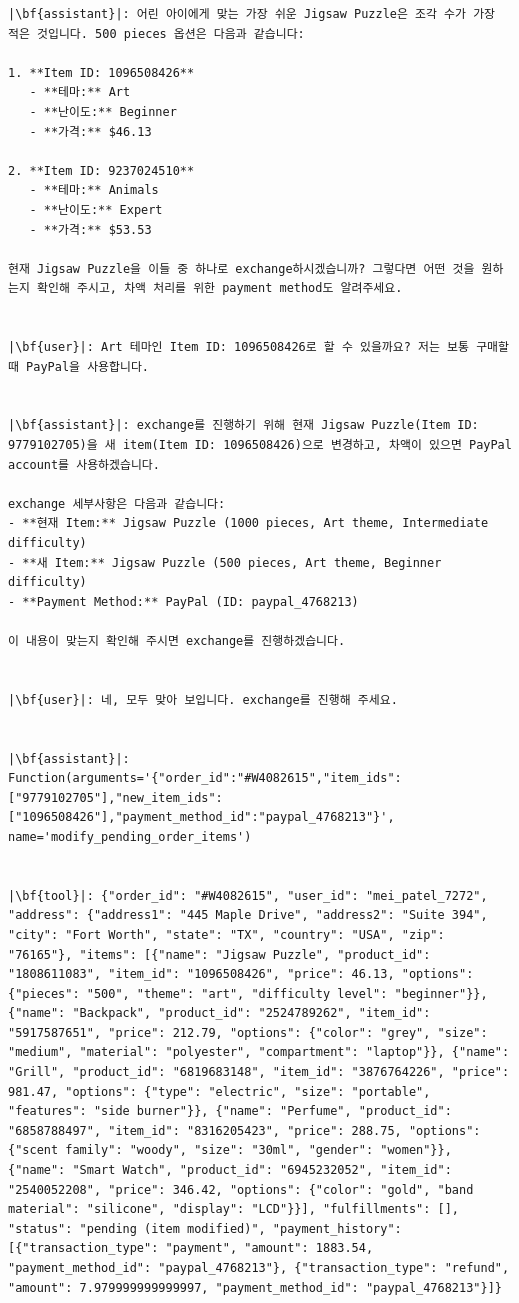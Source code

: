 \begin{verbatim}
|\bf{assistant}|: 어린 아이에게 맞는 가장 쉬운 Jigsaw Puzzle은 조각 수가 가장 적은 것입니다. 500 pieces 옵션은 다음과 같습니다:

1. **Item ID: 1096508426**
   - **테마:** Art
   - **난이도:** Beginner
   - **가격:** $46.13

2. **Item ID: 9237024510**
   - **테마:** Animals
   - **난이도:** Expert
   - **가격:** $53.53

현재 Jigsaw Puzzle을 이들 중 하나로 exchange하시겠습니까? 그렇다면 어떤 것을 원하는지 확인해 주시고, 차액 처리를 위한 payment method도 알려주세요.


|\bf{user}|: Art 테마인 Item ID: 1096508426로 할 수 있을까요? 저는 보통 구매할 때 PayPal을 사용합니다.


|\bf{assistant}|: exchange를 진행하기 위해 현재 Jigsaw Puzzle(Item ID: 9779102705)을 새 item(Item ID: 1096508426)으로 변경하고, 차액이 있으면 PayPal account를 사용하겠습니다.

exchange 세부사항은 다음과 같습니다:
- **현재 Item:** Jigsaw Puzzle (1000 pieces, Art theme, Intermediate difficulty)
- **새 Item:** Jigsaw Puzzle (500 pieces, Art theme, Beginner difficulty)
- **Payment Method:** PayPal (ID: paypal_4768213)

이 내용이 맞는지 확인해 주시면 exchange를 진행하겠습니다.


|\bf{user}|: 네, 모두 맞아 보입니다. exchange를 진행해 주세요.


|\bf{assistant}|: Function(arguments='{"order_id":"#W4082615","item_ids":["9779102705"],"new_item_ids":["1096508426"],"payment_method_id":"paypal_4768213"}', name='modify_pending_order_items')


|\bf{tool}|: {"order_id": "#W4082615", "user_id": "mei_patel_7272", "address": {"address1": "445 Maple Drive", "address2": "Suite 394", "city": "Fort Worth", "state": "TX", "country": "USA", "zip": "76165"}, "items": [{"name": "Jigsaw Puzzle", "product_id": "1808611083", "item_id": "1096508426", "price": 46.13, "options": {"pieces": "500", "theme": "art", "difficulty level": "beginner"}}, {"name": "Backpack", "product_id": "2524789262", "item_id": "5917587651", "price": 212.79, "options": {"color": "grey", "size": "medium", "material": "polyester", "compartment": "laptop"}}, {"name": "Grill", "product_id": "6819683148", "item_id": "3876764226", "price": 981.47, "options": {"type": "electric", "size": "portable", "features": "side burner"}}, {"name": "Perfume", "product_id": "6858788497", "item_id": "8316205423", "price": 288.75, "options": {"scent family": "woody", "size": "30ml", "gender": "women"}}, {"name": "Smart Watch", "product_id": "6945232052", "item_id": "2540052208", "price": 346.42, "options": {"color": "gold", "band material": "silicone", "display": "LCD"}}], "fulfillments": [], "status": "pending (item modified)", "payment_history": [{"transaction_type": "payment", "amount": 1883.54, "payment_method_id": "paypal_4768213"}, {"transaction_type": "refund", "amount": 7.979999999999997, "payment_method_id": "paypal_4768213"}]}



\end{verbatim}
